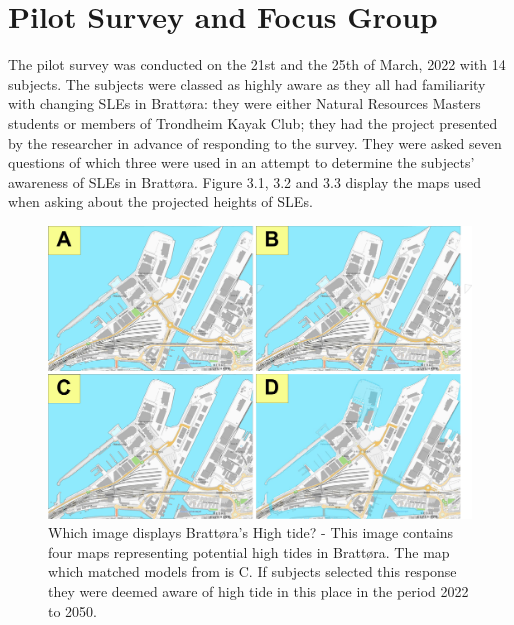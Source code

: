 \section{Pilot Survey and Focus Group}

The pilot survey was conducted on the 21st and the 25th of March, 2022 with 14 subjects. The subjects were classed as highly aware as they all had familiarity with changing SLEs in Brattøra: they were either Natural Resources Masters students or members of Trondheim Kayak Club; they had the project presented by the researcher in advance of responding to the survey. They were asked seven questions of which three were used in an attempt to determine the subjects' awareness of SLEs in Brattøra. Figure 3.1, 3.2 and 3.3 display the maps used when asking about the projected heights of SLEs.

\begin{figure} [H]
    \centering
    \includegraphics[width=16cm]{fig/brattora question on 2022 high tide quadrant.png}
    \caption{Which image displays Brattøra's High tide? -  This image contains four maps representing potential high tides in Brattøra. The map which matched models from \cite{kartverket_se_2021} is C. If subjects selected this response they were deemed aware of high tide in this place in the period 2022 to 2050. }
    \label{fig:Brattora_2022_hightide}
\end{figure}

